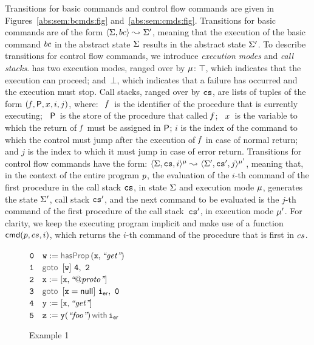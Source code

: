 Transitions for basic commands and control flow commands are given 
in Figures~\ref{abs:sem:bcmds:fig} and~\ref{abs:sem:cmds:fig}. Transitions for 
basic commands are of the form 
$\langle \Sigma, bc \rangle \leadsto_{} \Sigma'$, meaning that the execution of the basic command 
$bc$ in the abstract state $\Sigma$ results in the abstract state $\Sigma'$. 
%
To describe transitions for control flow commands, we introduce \emph{execution modes} and 
\emph{call stacks}.  \jsil has two execution modes, ranged over by $\mu$: 
$\top$, which indicates that the execution can proceed; and~$\bot$, which indicates that a failure 
has occurred and the execution must stop. Call stacks, ranged over by $\mathtt{cs}$, are lists of tuples of the form $(\mathit{f}, {\sf P}, x, i, j)$, where: 
~$\mathit{f}$~is the identifier of the procedure that is currently executing;
~${\sf P}$~is the store of the procedure that called $\mathit{f}$; 
~$x$~is the variable to which the return of $\mathit{f}$ must be assigned in ${\sf P}$; 
 $i$ is the index of the command to which the control must jump after the execution of $\mathit{f}$ in case of normal return; 
and  $j$ is the index to which it must jump in case of error return. 
Transitions for control flow commands have the form:  $\langle \Sigma, \mathtt{cs}, i \rangle^{\mu} \leadsto_{} \langle \Sigma', \mathtt{cs}', j \rangle^{\mu'}$, 
meaning that, in the context of the entire program $p$, the evaluation of the $i$-th command of the first procedure in the 
call stack $\mathtt{cs}$, in state $\Sigma$ and execution mode $\mu$, generates 
the state $\Sigma'$, call stack $\mathtt{cs}'$,  and the next command to be evaluated is the $j$-th command of the first procedure 
of the call stack~$\mathtt{cs}'$, in execution mode $\mu'$. 
For clarity, we keep the executing program implicit and make use of a function $\ccmd{\prog, \cs, i}$, which 
returns the $i$-th command of the procedure that is first in $cs$. %



\begin{figure}
{\small
\hspace*{0.25cm} $\mathtt{0\quad w := \hasfield(x, \litstring{get})}$ \\
\hspace*{0.25cm} $\mathtt{1\quad \ifgoto{w}{4}{2}}$ \\
\hspace*{0.25cm} $\mathtt{2\quad x := [x, \text{{\it ``\ensuremath{\mathit{@proto}}''}}] }$ \\ 
\hspace*{0.25cm} $\mathtt{3\quad \ifgoto{x = \jnull}{\errlab}{0}}$ \\
\hspace*{0.25cm} $\mathtt{4\quad y := [x, \text{{\it ``get''}}]}$ \\
\hspace*{0.25cm} $\mathtt{5\quad \jsilcall{z}{y}{\litstring{foo}}{\errlab}}$ 
}
\caption{\jsil Example 1\label{jsil:example:frame}}
\end{figure}

